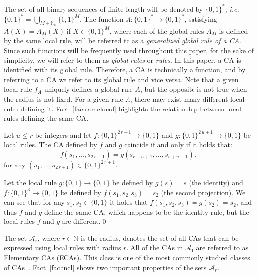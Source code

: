 The set of all binary sequences of finite length will be denoted by $\{0,1\}^\ast$, \emph{i.e.}\ $\{0,1\}^\ast = \bigcup_{M\in\mathbb{N}_0}\{0,1\}^M$. The function $A\colon \{0,1\}^\ast\to\{0,1\}^\ast$, satisfying $A(X) = A_M(X)$ if $X\in\{0,1\}^M$, where each of the global rules $A_M$ is defined by the same local rule, will be referred to as a \emph{generalized global rule of a CA}. Since such functions will be frequently used throughout this paper, for the sake of simplicity, we will refer to them as \emph{global rules} or \emph{rules}. In this paper, a CA is identified with its global rule. Therefore, a CA is technically a function, and by referring to a CA we refer to its global rule and vice versa.
Note that a given local rule $f_A$ uniquely defines a global rule $A$, but the opposite is not true when the radius is not fixed. For a given rule $A$, there may exist many different local rules defining it.
Fact~\ref{fac:samelocal} highlights the relationship between local rules defining the same CA.

\begin{fact}
Let $u\leq r$ be integers and let $f\colon\{0,1\}^{2\,r+1}\to\{0,1\}$ and $g\colon\{0,1\}^{2\,u+1}\to\{0,1\}$ be local rules. The CA defined by $f$ and $g$ coincide if and only if it holds that:
\begin{equation}
f(s_1,\dotsc,s_{2\,r+1}) = g(s_{r-u+1},\dotsc,s_{r+u+1})\,,
\end{equation}
for any $(s_1,\dotsc,s_{2\,r+1})\in\{0,1\}^{2\,r+1}$.\label{fac:samelocal}
\end{fact}

\begin{example}
Let the local rule $g\colon \{0,1\}\to\{0,1\}$ be defined by $g(s) = s$ (the identity) and $f\colon \{0,1\}^3\to\{0,1\}$ be defined by $f(s_1, s_2, s_3)=s_2$ (the second projection). We can see that for any $s_1, s_3\in\{0,1\}$ it holds that $f(s_1, s_2, s_3) = g(s_2) = s_2$, and thus $f$ and $g$ define the same CA, which happens to be the identity rule, but the local rules $f$ and $g$ are different.\qed
\end{example}

The set $\mathcal{A}_r$, where $r\in\mathbb{N}$ is the radius, denotes the set of all CAs that can be expressed using local rules with radius $r$. All of the CAs in $\mathcal{A}_1$ are referred to as Elementary CAs (ECAs). This class is one of the most commonly studied classes of CAs~\cite{RevModPhys.55.601}. Fact~\ref{fac:incl} shows two important properties of the sets $\mathcal{A}_r$.

